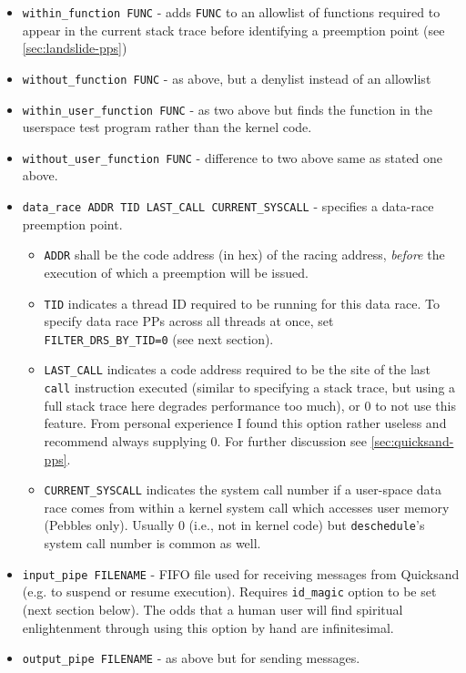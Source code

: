 \begin{itemize}
	\item {\tt within\_function FUNC} - adds {\tt FUNC} to an allowlist of functions required to appear in the current stack trace before identifying a preemption point (see \cref{sec:landslide-pps})
	\item {\tt without\_function FUNC} - as above, but a denylist instead of an allowlist
	\item {\tt within\_user\_function FUNC} - as two above but finds the function in the userspace test program rather than the kernel code.
	\item {\tt without\_user\_function FUNC} - difference to two above same as stated one above.
	\item {\tt data\_race ADDR TID LAST\_CALL CURRENT\_SYSCALL} - specifies a data-race preemption point.
		\begin{itemize}
			\item {\tt ADDR} shall be the code address (in hex) of the racing address,
			{\em before} the execution of which a preemption will be issued.
			\item {\tt TID} indicates a thread ID required to be running for this data race.
				To specify data race PPs across all threads at once, set {\tt FILTER\_DRS\_BY\_TID=0} (see next section).
			\item {\tt LAST\_CALL} indicates a code address required to be the site of the last {\tt call} instruction executed
				(similar to specifying a stack trace, but using a full stack trace here degrades performance too much),
				or 0 to not use this feature.
				From personal experience I found this option rather useless and recommend always supplying 0.
				For further discussion see \cref{sec:quicksand-pps}.
			\item {\tt CURRENT\_SYSCALL} indicates the system call number if a user-space data race comes from within a kernel system call which accesses user memory (Pebbles only).
				Usually 0 (i.e., not in kernel code) but {\tt deschedule}'s system call number is common as well.
		\end{itemize}
	\item {\tt input\_pipe FILENAME} - FIFO file used for receiving messages from Quicksand (e.g. to suspend or resume execution).
		Requires {\tt id\_magic} option to be set (next section below).
		The odds that a human user will find spiritual enlightenment through using this option by hand are infinitesimal.
	\item {\tt output\_pipe FILENAME} - as above but for sending messages.
\end{itemize}

